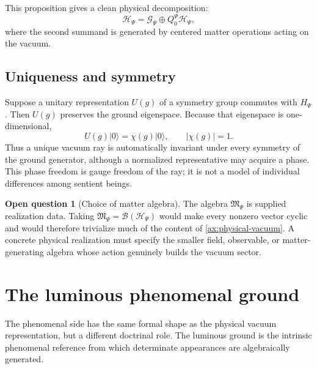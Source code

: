 \documentclass[11pt,reqno]{scrartcl}
\newcommand{\scrHP}{\mathscr H_{\Psi}}
\newcommand{\algP}{\mathfrak M_{\Psi}}
\newcommand{\QzeroP}{Q_{0}^{\Psi}}
\newcommand{\ket}[1]{\lvert #1\rangle}
\theoremstyle{plain}
\theoremstyle{definition}
\newtheorem{openquestion}[openquestion]{Open question}
\theoremstyle{remark}
\begin{document}
This proposition gives a clean physical decomposition:
\begin{equation}
  \scrHP
  =\mathscr G_{\Psi}\oplus\QzeroP\scrHP,
\end{equation}
where the second summand is generated by centered matter operations acting on
the vacuum.

\subsection{Uniqueness and symmetry}

Suppose a unitary representation $U(g)$ of a symmetry group commutes with
$H_{\Psi}$.  Then $U(g)$ preserves the ground eigenspace.  Because that
eigenspace is one-dimensional,
\begin{equation}
  U(g)\ket0=\chi(g)\ket0,
  \qquad |\chi(g)|=1.
  \label{eq:vacuum-symmetry-phase}
\end{equation}
Thus a unique vacuum ray is automatically invariant under every symmetry of
the ground generator, although a normalized representative may acquire a
phase.  This phase freedom is gauge freedom of the ray; it is not a model of
individual differences among sentient beings.

\begin{openquestion}[Choice of matter algebra]
\label{q:matter-algebra}
The algebra $\algP$ is supplied realization data.  Taking
$\algP=\mathcal B(\scrHP)$ would make every nonzero vector cyclic and would
therefore trivialize much of the content of \cref{ax:physical-vacuum}.  A
concrete physical realization must specify the smaller field, observable, or
matter-generating algebra whose action genuinely builds the vacuum sector.
\end{openquestion}
\section{The luminous phenomenal ground}
\label{sec:luminous-cyclic-ground}

The phenomenal side has the same formal shape as the physical vacuum
representation, but a different doctrinal role.  The luminous ground is the
intrinsic phenomenal reference from which determinate appearances are
algebraically generated.
\end{document}
